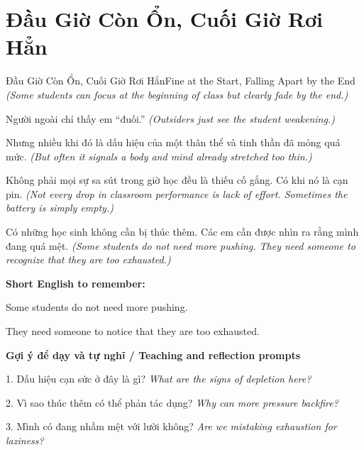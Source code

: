 \section{Đầu Giờ Còn Ổn, Cuối Giờ Rơi Hẳn}
\begin{truyen}{Đầu Giờ Còn Ổn, Cuối Giờ Rơi Hẳn}{Fine at the Start, Falling Apart by the End}
\textit{(Some students can focus at the beginning of class but clearly fade by the end.)}

Người ngoài chỉ thấy em “đuối.”
\textit{(Outsiders just see the student weakening.)}

Nhưng nhiều khi đó là dấu hiệu của một thân thể và tinh thần đã mỏng quá mức.
\textit{(But often it signals a body and mind already stretched too thin.)}

Không phải mọi sự sa sút trong giờ học đều là thiếu cố gắng. Có khi nó là cạn pin.
\textit{(Not every drop in classroom performance is lack of effort. Sometimes the battery is simply empty.)}

\end{truyen}

\begin{baihoc}
Có những học sinh không cần bị thúc thêm. Các em cần được nhìn ra rằng mình đang quá mệt.
\textit{(Some students do not need more pushing. They need someone to recognize that they are too exhausted.)}
\end{baihoc}

\begin{ghinhoanh}
\textbf{Short English to remember:}

Some students do not need more pushing.

They need someone to notice that they are too exhausted.

\end{ghinhoanh}

\begin{tuhocnhanh}
\textbf{Gợi ý để dạy và tự nghĩ / Teaching and reflection prompts}

1. Dấu hiệu cạn sức ở đây là gì? \textit{What are the signs of depletion here?}

2. Vì sao thúc thêm có thể phản tác dụng? \textit{Why can more pressure backfire?}

3. Mình có đang nhầm mệt với lười không? \textit{Are we mistaking exhaustion for laziness?}
\end{tuhocnhanh}
\ngancach

